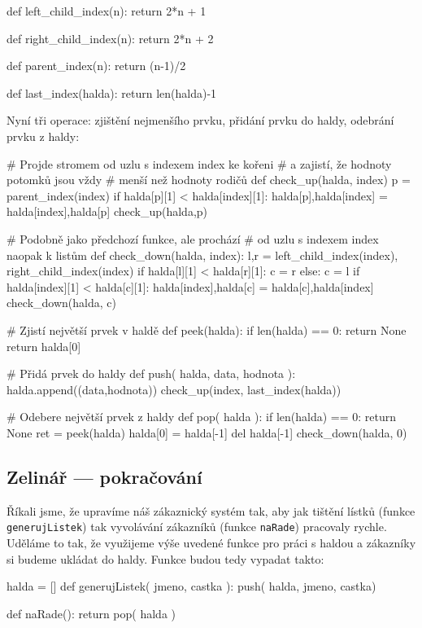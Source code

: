 \begin{python} 
def left_child_index(n):
  return 2*n + 1

def right_child_index(n):
  return 2*n + 2
  
def parent_index(n):
  return (n-1)/2
  
def last_index(halda):
  return len(halda)-1
\end{python}

Nyní tři operace: zjištění nejmenšího prvku, přidání prvku do haldy, odebrání prvku z haldy:

\begin{python}
# Projde stromem od uzlu s indexem index ke kořeni
# a zajistí, že hodnoty potomků jsou vždy
# menší než hodnoty rodičů
def check_up(halda, index)
  p = parent_index(index)
  if halda[p][1] < halda[index][1]:
    halda[p],halda[index] = halda[index],halda[p]
    check_up(halda,p)

# Podobně jako předchozí funkce, ale prochází
# od uzlu s indexem index naopak k listům
def check_down(halda, index):
  l,r = left_child_index(index), right_child_index(index)
  if halda[l][1] < halda[r][1]:
    c = r
  else:
    c = l
  if halda[index][1] < halda[c][1]:
    halda[index],halda[c] = halda[c],halda[index]
    check_down(halda, c)    
    
# Zjistí největší prvek v haldě
def peek(halda):
  if len(halda) == 0:
    return None
  return halda[0]

# Přidá prvek do haldy
def push( halda, data, hodnota ):
  halda.append((data,hodnota))
  check_up(index, last_index(halda))

# Odebere největší prvek z haldy
def pop( halda ):
  if len(halda) == 0:
    return None
  ret = peek(halda)
  halda[0] = halda[-1]
  del halda[-1]
  check_down(halda, 0)
\end{python}


\subsection*{Zelinář --- pokračování} 

Říkali jsme, že upravíme náš zákaznický systém tak, aby jak tištění lístků (funkce {\tt generujListek}) tak vyvolávání zákazníků
(funkce {\tt naRade}) pracovaly rychle. Uděláme to tak, že využijeme výše uvedené funkce pro práci s haldou a zákazníky si budeme
ukládat do haldy. Funkce budou tedy vypadat takto:

\begin{python}
halda = []
def generujListek( jmeno, castka ):
  push( halda, jmeno, castka)

def naRade():
  return pop( halda ) 
\end{python}

